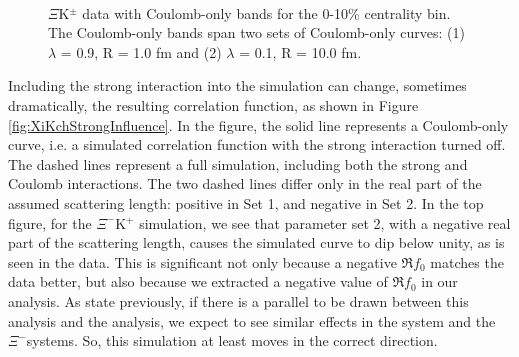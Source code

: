 \documentclass[/home/jesse/Analysis/FemtoAnalysis/AnalysisNotes/AnalysisNoteJBuxton.tex]{subfiles}
\begin{document}
\begin{figure}[h]
  \centering
  \\
  \caption[$\Xi$K$^{\pm}$ data with Coulomb-only bands, 0-10\% centrality]{$\Xi$K$^{\pm}$ data with Coulomb-only bands for the 0-10\% centrality bin.  The Coulomb-only bands span two sets of Coulomb-only curves: (1) $\lambda$ = 0.9, R = 1.0 fm and (2) $\lambda$ = 0.1, R = 10.0 fm.}
  \label{fig:XiKchCoulombOnlyBand}
\end{figure}

Including the strong interaction into the simulation can change, sometimes dramatically, the resulting correlation function, as shown in Figure \ref{fig:XiKchStrongInfluence}.  
In the figure, the solid line represents a Coulomb-only curve, i.e. a simulated correlation function with the strong interaction turned off.  
The dashed lines represent a full simulation, including both the strong and Coulomb interactions.  
The two dashed lines differ only in the real part of the assumed scattering length: positive in Set 1, and negative in Set 2.  
In the top figure, for the $\Xi^{-}$K$^{+}$ simulation, we see that parameter set 2, with a negative real part of the scattering length, causes the simulated curve to dip below unity, as is seen in the data. 
This is significant not only because a negative $\Re f_{0}$ matches the data better, but also because we extracted a negative value of $\Re f_{0}$ in our \LamKchP analysis. 
As state previously, if there is a parallel to be drawn between this analysis and the \LamKpm analysis, we expect to see similar effects in the \LamKchP system and the $\Xi^{-}$\KchP systems.
So, this simulation at least moves in the correct direction.
\end{document}
